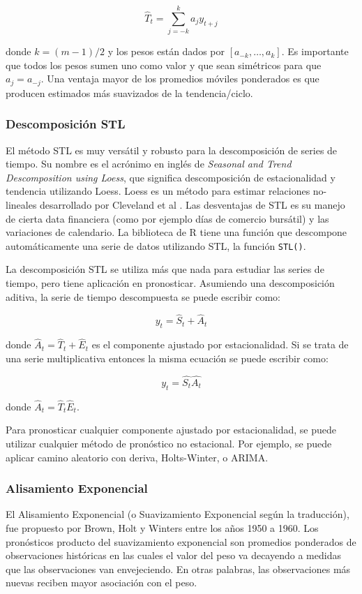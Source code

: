 \[ \hat{T}_{t} = \sum_{j = -k}^{k} a_j y_{t + j}  \]

donde $k=(m-1)/2$ y los pesos están dados por $[a_{-k}, \ldots, a_{k}]$. Es importante que todos los pesos sumen uno como valor y que sean simétricos para que $a_{j} = a_{-j}$. Una ventaja mayor de los promedios móviles ponderados es que producen estimados más suavizados de la tendencia/ciclo. 

\subsubsection{Descomposición STL}
El método STL es muy versátil y robusto para la descomposición de series de tiempo. Su nombre es el acrónimo en inglés de \emph{Seasonal and Trend Descomposition using Loess}, que significa descomposición de estacionalidad y tendencia utilizando Loess. Loess es un método para estimar relaciones no-lineales desarrollado por Cleveland et al \cite{hyndman}. Las desventajas de STL es su manejo de cierta data financiera (como por ejemplo días de comercio bursátil) y las variaciones de calendario. La biblioteca de R tiene una función que descompone automáticamente una serie de datos utilizando STL, la función \texttt{STL()}.

La descomposición STL se utiliza más que nada para estudiar las series de tiempo, pero tiene aplicación en pronosticar. Asumiendo una descomposición aditiva, la serie de tiempo descompuesta se puede escribir como:

\[ y_{t} = \hat{S}_t + \hat{A}_t \]

donde $\hat{A}_t = \hat{T}_t + \hat{E}_t$ es el componente ajustado por estacionalidad. Si se trata de una serie multiplicativa entonces la misma ecuación se puede escribir como: 

\[ y_{t} = \hat{S_t}\hat{A_t}\]

donde $\hat{A}_t = \hat{T}_t\hat{E}_t$. 

Para pronosticar cualquier componente ajustado por estacionalidad, se puede utilizar cualquier método de pronóstico no estacional. Por ejemplo, se puede aplicar camino aleatorio con deriva, Holts-Winter, o ARIMA.

\subsubsection{Alisamiento Exponencial}
El Alisamiento Exponencial (o Suavizamiento Exponencial según la traducción), fue propuesto por Brown, Holt y Winters entre los años 1950 a 1960. Los pronósticos producto del suavizamiento exponencial son promedios ponderados de observaciones históricas en las cuales el valor del peso va decayendo a medidas que las observaciones van envejeciendo. En otras palabras, las observaciones más nuevas reciben mayor asociación con el peso. 

